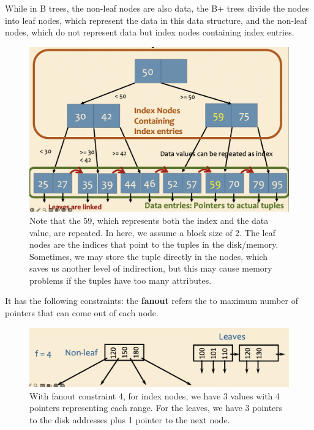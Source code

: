 \documentclass{article}
\begin{document}
    \begin{definition}[B+ Tree]
      While in B trees, the non-leaf nodes are also data, the B+ trees divide the nodes into leaf nodes, which represent the data in this data structure, and the non-leaf nodes, which do not represent data but index nodes containing index entries. 

      \begin{figure}[H]
        \centering 
        \includegraphics[scale=0.4]{img/bp_tree.png}
        \caption{Note that the 59, which represents both the index and the data value, are repeated. In here, we assume a block size of 2. The leaf nodes are the indices that point to the tuples in the disk/memory. Sometimes, we may store the tuple directly in the nodes, which saves us another level of indirection, but this may cause memory problems if the tuples have too many attributes.} 
        \label{fig:bp_tree}
      \end{figure}

      It has the following constraints: the \textbf{fanout} refers the to maximum number of pointers that can come out of each node. 

      \begin{figure}[H]
        \centering 
        \includegraphics[scale=0.4]{img/fanout.png}
        \caption{With fanout constraint 4, for index nodes, we have 3 values with 4 pointers representing each range. For the leaves, we have 3 pointers to the disk addresses plus 1 pointer to the next node. } 
        \label{fig:fanout}
      \end{figure}


\end{definition}
\end{document}
